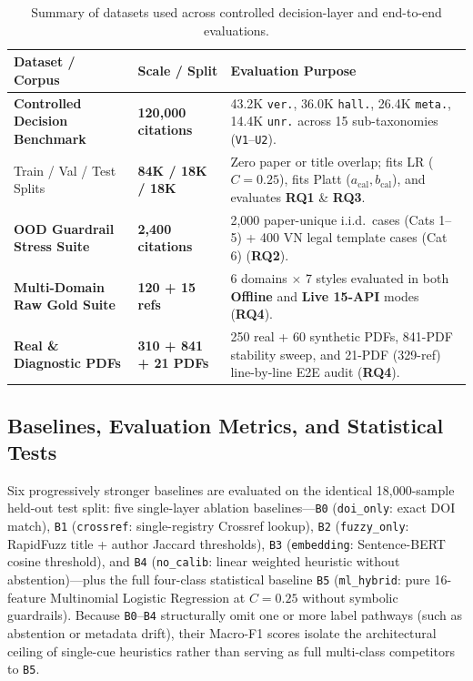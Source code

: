 {\setlength{\tabcolsep}{3.5pt}
\begin{table}[!htbp]
\centering
\caption{Summary of datasets used across controlled decision-layer and end-to-end evaluations.}\label{tab:dataset}
\begin{tabular}{|L{0.35}|L{0.23}|L{0.42}|}
\hline
\textbf{Dataset / Corpus} & \textbf{Scale / Split} & \textbf{Evaluation Purpose} \\
\hline
\textbf{Controlled Decision Benchmark} & \textbf{120,000 citations} & 43.2K \texttt{ver.}, 36.0K \texttt{hall.}, 26.4K \texttt{meta.}, 14.4K \texttt{unr.} across 15 sub-taxonomies (\texttt{V1}--\texttt{U2}). \\
\hline
\quad Train / Val / Test Splits & \textbf{84K / 18K / 18K} & Zero paper or title overlap; fits LR ($C=0.25$), fits Platt ($a_{\text{cal}}, b_{\text{cal}}$), and evaluates \textbf{RQ1} \& \textbf{RQ3}. \\
\hline
\textbf{OOD Guardrail Stress Suite} & \textbf{2,400 citations} & 2,000 paper-unique i.i.d.\ cases (Cats 1--5) + 400 VN legal template cases (Cat 6) (\textbf{RQ2}). \\
\hline
\textbf{Multi-Domain Raw Gold Suite} & \textbf{120 + 15 refs} & 6 domains $\times$ 7 styles evaluated in both \textbf{Offline} and \textbf{Live 15-API} modes (\textbf{RQ4}). \\
\hline
\textbf{Real \& Diagnostic PDFs} & \textbf{310 + 841 + 21 PDFs} & 250 real + 60 synthetic PDFs, 841-PDF stability sweep, and 21-PDF (329-ref) line-by-line E2E audit (\textbf{RQ4}). \\
\hline
\end{tabular}
\end{table}
}

\subsection{Baselines, Evaluation Metrics, and Statistical Tests}

Six progressively stronger baselines are evaluated on the identical 18,000-sample held-out test split: five single-layer ablation baselines---\texttt{B0} (\texttt{doi\_only}: exact DOI match), \texttt{B1} (\texttt{crossref}: single-registry Crossref lookup), \texttt{B2} (\texttt{fuzzy\_only}: RapidFuzz title + author Jaccard thresholds), \texttt{B3} (\texttt{embedding}: Sentence-BERT cosine threshold), and \texttt{B4} (\texttt{no\_calib}: linear weighted heuristic without abstention)---plus the full four-class statistical baseline \texttt{B5} (\texttt{ml\_hybrid}: pure 16-feature Multinomial Logistic Regression at $C = 0.25$ without symbolic guardrails). Because \texttt{B0}--\texttt{B4} structurally omit one or more label pathways (such as abstention or metadata drift), their Macro-F1 scores isolate the architectural ceiling of single-cue heuristics rather than serving as full multi-class competitors to \texttt{B5}.

